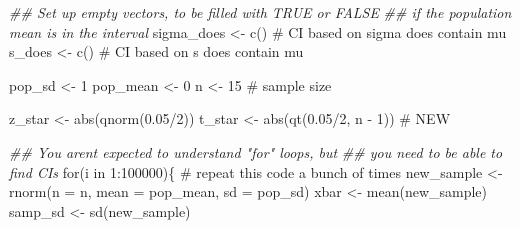 \documentclass[
  letterpaper,
  DIV=11,
  numbers=noendperiod,
  oneside]{scrreprt}
\newenvironment{Shaded}{\begin{snugshade}}{\end{snugshade}}
\newcommand{\AttributeTok}[1]{\textcolor[rgb]{0.40,0.45,0.13}{#1}}
\newcommand{\CommentTok}[1]{\textcolor[rgb]{0.37,0.37,0.37}{#1}}
\newcommand{\ControlFlowTok}[1]{\textcolor[rgb]{0.00,0.23,0.31}{#1}}
\newcommand{\DecValTok}[1]{\textcolor[rgb]{0.68,0.00,0.00}{#1}}
\newcommand{\DocumentationTok}[1]{\textcolor[rgb]{0.37,0.37,0.37}{\textit{#1}}}
\newcommand{\FloatTok}[1]{\textcolor[rgb]{0.68,0.00,0.00}{#1}}
\newcommand{\FunctionTok}[1]{\textcolor[rgb]{0.28,0.35,0.67}{#1}}
\newcommand{\NormalTok}[1]{\textcolor[rgb]{0.00,0.23,0.31}{#1}}
\newcommand{\OtherTok}[1]{\textcolor[rgb]{0.00,0.23,0.31}{#1}}
\newcommand{\SpecialCharTok}[1]{\textcolor[rgb]{0.37,0.37,0.37}{#1}}
\begin{document}
\begin{Shaded}
\begin{Highlighting}[]
\DocumentationTok{\#\# Set up empty vectors, to be filled with TRUE or FALSE}
\DocumentationTok{\#\# if the population mean is in the interval}
\NormalTok{sigma\_does }\OtherTok{\textless{}{-}} \FunctionTok{c}\NormalTok{() }\CommentTok{\# CI based on sigma does contain mu}
\NormalTok{s\_does }\OtherTok{\textless{}{-}} \FunctionTok{c}\NormalTok{() }\CommentTok{\# CI based on s does contain mu}

\NormalTok{pop\_sd }\OtherTok{\textless{}{-}} \DecValTok{1}
\NormalTok{pop\_mean }\OtherTok{\textless{}{-}} \DecValTok{0}
\NormalTok{n }\OtherTok{\textless{}{-}} \DecValTok{15} \CommentTok{\# sample size}

\NormalTok{z\_star }\OtherTok{\textless{}{-}} \FunctionTok{abs}\NormalTok{(}\FunctionTok{qnorm}\NormalTok{(}\FloatTok{0.05}\SpecialCharTok{/}\DecValTok{2}\NormalTok{))}
\NormalTok{t\_star }\OtherTok{\textless{}{-}} \FunctionTok{abs}\NormalTok{(}\FunctionTok{qt}\NormalTok{(}\FloatTok{0.05}\SpecialCharTok{/}\DecValTok{2}\NormalTok{, n }\SpecialCharTok{{-}} \DecValTok{1}\NormalTok{)) }\CommentTok{\# NEW}

\DocumentationTok{\#\# You aren\textquotesingle{}t expected to understand "for" loops, but}
\DocumentationTok{\#\# you need to be able to find CIs}
\ControlFlowTok{for}\NormalTok{(i }\ControlFlowTok{in} \DecValTok{1}\SpecialCharTok{:}\DecValTok{100000}\NormalTok{)\{ }\CommentTok{\# repeat this code a bunch of times}
\NormalTok{    new\_sample }\OtherTok{\textless{}{-}} \FunctionTok{rnorm}\NormalTok{(}\AttributeTok{n =}\NormalTok{ n, }\AttributeTok{mean =}\NormalTok{ pop\_mean, }\AttributeTok{sd =}\NormalTok{ pop\_sd)}
\NormalTok{    xbar }\OtherTok{\textless{}{-}} \FunctionTok{mean}\NormalTok{(new\_sample)}
\NormalTok{    samp\_sd }\OtherTok{\textless{}{-}} \FunctionTok{sd}\NormalTok{(new\_sample)}


\end{Highlighting}
\end{Shaded}
\end{document}
